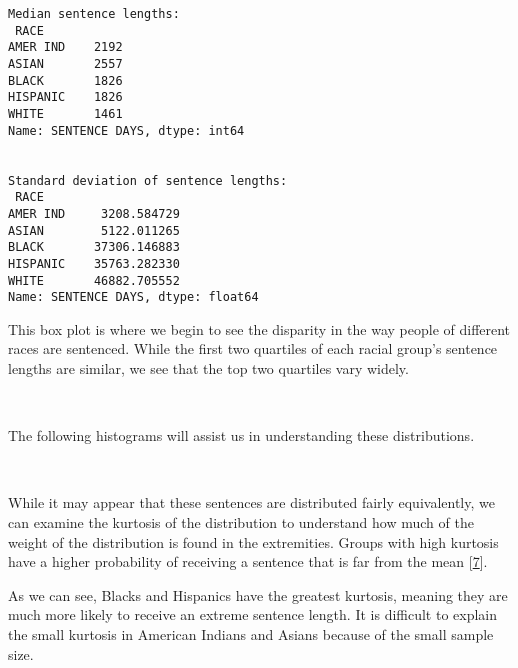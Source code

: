 \documentclass[11pt]{article}
\begin{document}
    \begin{Verbatim}[commandchars=\\\{\}]
Median sentence lengths:
 RACE
AMER IND    2192
ASIAN       2557
BLACK       1826
HISPANIC    1826
WHITE       1461
Name: SENTENCE DAYS, dtype: int64


Standard deviation of sentence lengths:
 RACE
AMER IND     3208.584729
ASIAN        5122.011265
BLACK       37306.146883
HISPANIC    35763.282330
WHITE       46882.705552
Name: SENTENCE DAYS, dtype: float64

    \end{Verbatim}

    This box plot is where we begin to see the disparity in the way people
of different races are sentenced. While the first two quartiles of each
racial group's sentence lengths are similar, we see that the top two
quartiles vary widely.

    \begin{center}
    \end{center}
    { \hspace*{\fill} \\}
    
    The following histograms will assist us in understanding these
distributions.

    \begin{center}
    \end{center}
    { \hspace*{\fill} \\}
    
    While it may appear that these sentences are distributed fairly
equivalently, we can examine the kurtosis of the distribution to
understand how much of the weight of the distribution is found in the
extremities. Groups with high kurtosis have a higher probability of
receiving a sentence that is far from the mean
{[}\href{https://www.tandfonline.com/doi/full/10.1080/00031305.2014.917055?scroll=top\&needAccess=true}{7}{]}.

As we can see, Blacks and Hispanics have the greatest kurtosis, meaning
they are much more likely to receive an extreme sentence length. It is
difficult to explain the small kurtosis in American Indians and Asians
because of the small sample size.
\end{document}

